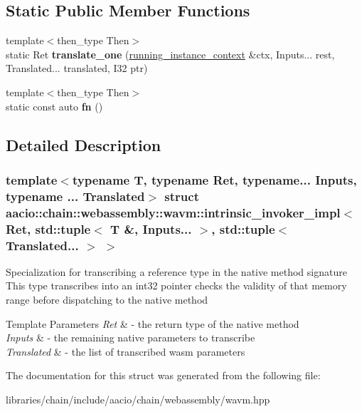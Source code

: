 \subsection*{Static Public Member Functions}
\begin{DoxyCompactItemize}
\item 
\mbox{\label{structaacio_1_1chain_1_1webassembly_1_1wavm_1_1intrinsic__invoker__impl_3_01_ret_00_01std_1_1tupfa2034b22b99cd06aa81fc0ac2ffb564_a98e8869e0cbad2968c438e67deb8af0a}} 
{\footnotesize template$<$then\+\_\+type Then$>$ }\\static Ret {\bfseries translate\+\_\+one} (\mbox{\hyperlink{structaacio_1_1chain_1_1webassembly_1_1wavm_1_1running__instance__context}{running\+\_\+instance\+\_\+context}} \&ctx, Inputs... rest, Translated... translated, I32 ptr)
\item 
\mbox{\label{structaacio_1_1chain_1_1webassembly_1_1wavm_1_1intrinsic__invoker__impl_3_01_ret_00_01std_1_1tupfa2034b22b99cd06aa81fc0ac2ffb564_afcd19fdc0b87173e91bd7b6a8a631fc7}} 
{\footnotesize template$<$then\+\_\+type Then$>$ }\\static const auto {\bfseries fn} ()
\end{DoxyCompactItemize}


\subsection{Detailed Description}
\subsubsection*{template$<$typename T, typename Ret, typename... Inputs, typename ... Translated$>$\newline
struct aacio\+::chain\+::webassembly\+::wavm\+::intrinsic\+\_\+invoker\+\_\+impl$<$ Ret, std\+::tuple$<$ T \&, Inputs... $>$, std\+::tuple$<$ Translated... $>$ $>$}

Specialization for transcribing a reference type in the native method signature This type transcribes into an int32 pointer checks the validity of that memory range before dispatching to the native method


\begin{DoxyTemplParams}{Template Parameters}
{\em Ret} & -\/ the return type of the native method \\
\hline
{\em Inputs} & -\/ the remaining native parameters to transcribe \\
\hline
{\em Translated} & -\/ the list of transcribed wasm parameters \\
\hline
\end{DoxyTemplParams}


The documentation for this struct was generated from the following file\+:\begin{DoxyCompactItemize}
\item 
libraries/chain/include/aacio/chain/webassembly/wavm.\+hpp\end{DoxyCompactItemize}
